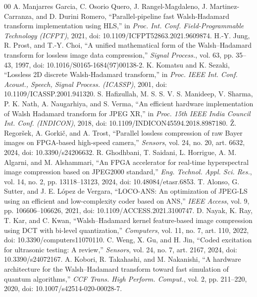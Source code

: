 \documentclass[conference]{IEEEtran}
\begin{document}
\begin{thebibliography}{00}
 A. Manjarres Garcia, C. Osorio Quero, J. Rangel-Magdaleno, J. Martinez-Carranza, and D. Durini Romero, ``Parallel-pipeline fast Walsh-Hadamard transform implementation using HLS,'' in \emph{Proc. Int. Conf. Field-Programmable Technology (ICFPT)}, 2021, doi: 10.1109/ICFPT52863.2021.9609874.
 H.-Y. Jung, R. Prost, and T.-Y. Choi, ``A unified mathematical form of the Walsh--Hadamard transform for lossless image data compression,'' \emph{Signal Process.}, vol. 63, pp. 35--43, 1997, doi: 10.1016/S0165-1684(97)00138-2.
 K. Komatsu and K. Sezaki, ``Lossless 2D discrete Walsh-Hadamard transform,'' in \emph{Proc. IEEE Int. Conf. Acoust., Speech, Signal Process. (ICASSP)}, 2001, doi: 10.1109/ICASSP.2001.941320.
 S. Hafizullah, M. S. S. V. S. Manideep, V. Sharma, P. K. Nath, A. Naugarhiya, and S. Verma, ``An efficient hardware implementation of Walsh Hadamard transform for JPEG XR,'' in \emph{Proc. 15th IEEE India Council Int. Conf. (INDICON)}, 2018, doi: 10.1109/INDICON45594.2018.8987180.
 \v{Z}. Regor\v{s}ek, A. Gorki\v{c}, and A. Trost, ``Parallel lossless compression of raw Bayer images on FPGA-based high-speed camera,'' \emph{Sensors}, vol. 24, no. 20, art. 6632, 2024, doi: 10.3390/s24206632.
 R. Ghodhbani, T. Saidani, L. Horrigue, A. M. Algarni, and M. Alshammari, ``An FPGA accelerator for real-time hyperspectral image compression based on JPEG2000 standard,'' \emph{Eng. Technol. Appl. Sci. Res.}, vol. 14, no. 2, pp. 13118--13123, 2024, doi: 10.48084/etasr.6853.
 T. Alonso, G. Sutter, and J. E. L\'opez de Vergara, ``LOCO-ANS: An optimization of JPEG-LS using an efficient and low-complexity coder based on ANS,'' \emph{IEEE Access}, vol. 9, pp. 106606--106626, 2021, doi: 10.1109/ACCESS.2021.3100747.
 D. Nayak, K. Ray, T. Kar, and C. Kwan, ``Walsh--Hadamard kernel feature-based image compression using DCT with bi-level quantization,'' \emph{Computers}, vol. 11, no. 7, art. 110, 2022, doi: 10.3390/computers11070110.
 C. Weng, X. Gu, and H. Jin, ``Coded excitation for ultrasonic testing: A review,'' \emph{Sensors}, vol. 24, no. 7, art. 2167, 2024, doi: 10.3390/s24072167.
 A. Kobori, R. Takahashi, and M. Nakanishi, ``A hardware architecture for the Walsh--Hadamard transform toward fast simulation of quantum algorithms,'' \emph{CCF Trans. High Perform. Comput.}, vol. 2, pp. 211--220, 2020, doi: 10.1007/s42514-020-00028-7.

\end{thebibliography}
\end{document}
